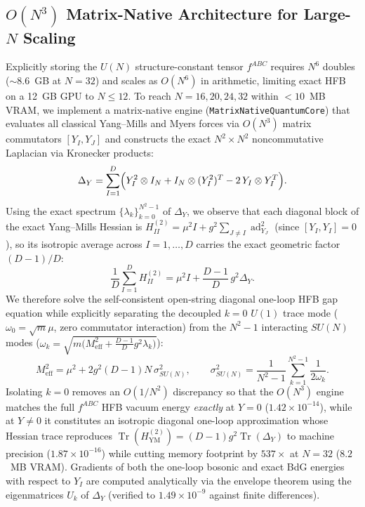 \documentclass[11pt,a4paper]{article}
\DeclareMathOperator{\Tr}{Tr}
\begin{document}
\subsection{$O(N^3)$ Matrix-Native Architecture for Large-$N$ Scaling}
Explicitly storing the $U(N)$ structure-constant tensor $f^{ABC}$ requires $N^6$ doubles ($\sim 8.6$~GB at $N=32$) and scales as $O(N^6)$ in arithmetic, limiting exact HFB on a 12~GB GPU to $N \le 12$. To reach $N=16, 20, 24, 32$ within $<10$~MB VRAM, we implement a matrix-native engine (\texttt{MatrixNativeQuantumCore}) that evaluates all classical Yang--Mills and Myers forces via $O(N^3)$ matrix commutators $[Y_I, Y_J]$ and constructs the exact $N^2\times N^2$ noncommutative Laplacian via Kronecker products:
\begin{equation}
  \Delta_Y = \sum_{I=1}^{D} \Bigl(Y_I^2 \otimes I_N + I_N \otimes (Y_I^2)^T - 2\,Y_I \otimes Y_I^T\Bigr).
  \label{eq:kron_lap}
\end{equation}
Using the exact spectrum $\{\lambda_k\}_{k=0}^{N^2-1}$ of $\Delta_Y$, we observe that each diagonal block of the exact Yang--Mills Hessian is $H^{(2)}_{II} = \mu^2 I + g^2 \sum_{J\neq I} \operatorname{ad}_{Y_J}^2$ (since $[Y_I, Y_I] = 0$), so its isotropic average across $I = 1,\dots,D$ carries the exact geometric factor $(D-1)/D$:
\begin{equation}
  \frac{1}{D}\sum_{I=1}^{D} H^{(2)}_{II} = \mu^2 I + \frac{D-1}{D}\,g^2 \Delta_Y.
\end{equation}
We therefore solve the self-consistent open-string diagonal one-loop HFB gap equation while explicitly separating the decoupled $k=0$ $U(1)$ trace mode ($\omega_0 = \sqrt{m}\mu$, zero commutator interaction) from the $N^2-1$ interacting $SU(N)$ modes ($\omega_k = \sqrt{m\bigl(M_{\mathrm{eff}}^2 + \frac{D-1}{D} g^2 \lambda_k\bigr)}$):
\begin{equation}
  M_{\mathrm{eff}}^2 = \mu^2 + 2 g^2 (D-1) N\,\sigma_{SU(N)}^2,
  \qquad
  \sigma_{SU(N)}^2 = \frac{1}{N^2-1}\sum_{k=1}^{N^2-1} \frac{1}{2\omega_k}.
  \label{eq:native_gap}
\end{equation}
Isolating $k=0$ removes an $O(1/N^2)$ discrepancy so that the $O(N^3)$ engine matches the full $f^{ABC}$ HFB vacuum energy \emph{exactly} at $Y=0$ ($1.42\times 10^{-14}$), while at $Y\neq 0$ it constitutes an isotropic diagonal one-loop approximation whose Hessian trace reproduces $\Tr(H^{(2)}_{\mathrm{YM}}) = (D-1)g^2\Tr(\Delta_Y)$ to machine precision ($1.87\times 10^{-16}$) while cutting memory footprint by $537\times$ at $N=32$ ($8.2$~MB VRAM). Gradients of both the one-loop bosonic and exact BdG energies with respect to $Y_I$ are computed analytically via the envelope theorem using the eigenmatrices $U_k$ of $\Delta_Y$ (verified to $1.49\times 10^{-9}$ against finite differences).
\end{document}
